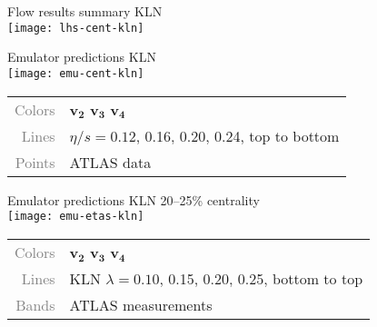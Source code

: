 \documentclass{beamer}
\begin{document}
\begin{frame}{Flow results summary}
  \vspace{2ex}
  \centering
  \hspace{3ex} KLN \\[.5ex]
  \texttt{[image: lhs-cent-kln]}
\end{frame}



\begin{frame}{Emulator predictions}
  \centering\vspace{1ex}
  \hspace{1ex} KLN \\[1ex]
  \texttt{[image: emu-cent-kln]} \\
  \small
  \begin{tabular}{rl}
    \textcolor{grey}{Colors} &
    \textcolor{vnbl}{$\boldsymbol{v_2}$}
    \textcolor{vngr}{$\boldsymbol{v_3}$}
    \textcolor{vnor}{$\boldsymbol{v_4}$} \\
    \textcolor{grey}{Lines} & $\eta/s = 0.12$, 0.16, 0.20, 0.24, top to bottom \\
    \textcolor{grey}{Points} & ATLAS data
  \end{tabular}
\end{frame}



\begin{frame}{Emulator predictions}
  \centering\vspace{1ex}
  \hspace{3ex} KLN 20--25\% centrality \\[1ex]
  \texttt{[image: emu-etas-kln]} \\
  \small
  \begin{tabular}{rl}
    \textcolor{grey}{Colors} &
    \textcolor{vnbl}{$\boldsymbol{v_2}$}
    \textcolor{vngr}{$\boldsymbol{v_3}$}
    \textcolor{vnor}{$\boldsymbol{v_4}$} \\
    \textcolor{grey}{Lines} & KLN $\lambda = 0.10$, 0.15, 0.20, 0.25, bottom to top \\
    \textcolor{grey}{Bands} & ATLAS measurements
  \end{tabular}
\end{frame}
\end{document}
